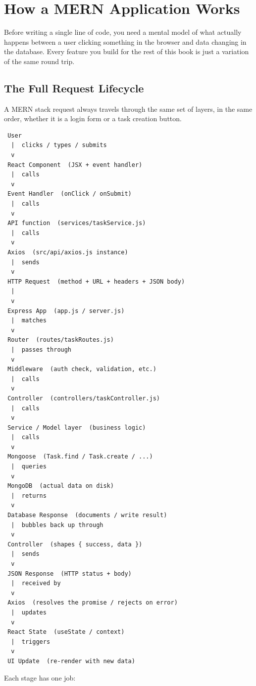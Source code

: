 \chapter{How a MERN Application Works}

Before writing a single line of code, you need a mental model of what actually
happens between a user clicking something in the browser and data changing in
the database. Every feature you build for the rest of this book is just a
variation of the same round trip.

\section{The Full Request Lifecycle}

A MERN stack request always travels through the same set of layers, in the
same order, whether it is a login form or a task creation button.

\begin{diagrambox}
\begin{verbatim}
 User
  |  clicks / types / submits
  v
 React Component  (JSX + event handler)
  |  calls
  v
 Event Handler  (onClick / onSubmit)
  |  calls
  v
 API function  (services/taskService.js)
  |  calls
  v
 Axios  (src/api/axios.js instance)
  |  sends
  v
 HTTP Request  (method + URL + headers + JSON body)
  |
  v
 Express App  (app.js / server.js)
  |  matches
  v
 Router  (routes/taskRoutes.js)
  |  passes through
  v
 Middleware  (auth check, validation, etc.)
  |  calls
  v
 Controller  (controllers/taskController.js)
  |  calls
  v
 Service / Model layer  (business logic)
  |  calls
  v
 Mongoose  (Task.find / Task.create / ...)
  |  queries
  v
 MongoDB  (actual data on disk)
  |  returns
  v
 Database Response  (documents / write result)
  |  bubbles back up through
  v
 Controller  (shapes { success, data })
  |  sends
  v
 JSON Response  (HTTP status + body)
  |  received by
  v
 Axios  (resolves the promise / rejects on error)
  |  updates
  v
 React State  (useState / context)
  |  triggers
  v
 UI Update  (re-render with new data)
\end{verbatim}
\end{diagrambox}

Each stage has one job:


